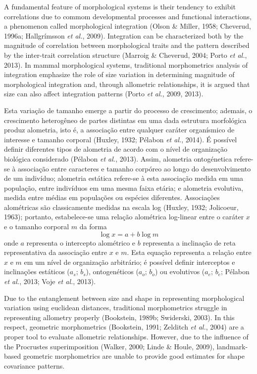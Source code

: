 \documentclass[11pt,twoside]{report}
\begin{document}
A fundamental feature of morphological systems is their tendency to
exhibit correlations due to commom developmental processes and
functional interactions, a phenomenon called morphological integration
(Olson \& Miller, 1958; Cheverud, 1996a; Hallgrímsson \emph{et al.},
2009). Integration can be characterized both by the magnitude of
correlation between morphological traits and the pattern described by
the inter-trait correlation structure (Marroig \& Cheverud, 2004; Porto
\emph{et al.}, 2013). In mammal morphological systems, traditional
morphometrics analysis of integration emphasize the role of size
variation in determining magnitude of morphological integration and,
through allometric relationships, it is argued that size can also affect
integration patterns (Porto \emph{et al.}, 2009, 2013).

Esta variação de tamanho emerge a partir do processo de crescimento;
ademais, o crescimento heterogêneo de partes distintas em uma dada
estrutura morfológica produz alometria, isto é, a associação entre
qualquer caráter organísmico de interesse e tamanho corporal (Huxley,
1932; Pélabon \emph{et al.}, 2014). É possível definir diferentes tipos
de alometria de acordo com o nível de organização biológica considerado
(Pélabon \emph{et al.}, 2013). Assim, alometria ontogénetica refere-se à
associação entre caracteres e tamanho corpóreo ao longo do
desenvolvimento de um indivíduo; alometria estática refere-se à esta
associação medida em uma população, entre indivíduos em uma mesma faixa
etária; e alometria evolutiva, medida entre médias em populações ou
espécies diferentes. Associações alométricas são classicamente medidas
na escala log (Huxley, 1932; Jolicoeur, 1963); portanto, estabelece-se
uma relação alométrica log-linear entre o caráter $x$ e o tamanho
corporal $m$ da forma \[
\log x = a + b \log m
\] onde $a$ representa o intercepto alométrico e $b$ representa a
inclinação de reta representativa da associação entre $x$ e $m$. Esta
equação representa a relação entre $x$ e $m$ em um nível de organização
arbitrário; é possível definir interceptos e inclinações estáticos
($a_s$; $b_s$), ontogenéticos ($a_o$; $b_o$) ou evolutivos ($a_e$;
$b_e$; Pélabon \emph{et al.}, 2013; Voje \emph{et al.}, 2013).

Due to the entanglement between size and shape in representing
morphological variation using euclidean distances, traditional
morphometrics struggle in representing allometry properly (Bookstein,
1989b; Swiderski, 2003). In this respect, geometric morphometrics
(Bookstein, 1991; Zelditch \emph{et al.}, 2004) are a proper tool to
evaluate allometric relationships. However, due to the influence of the
Procrustes superimposition (Walker, 2000; Linde \& Houle, 2009),
landmark-based geometric morphometrics are unable to provide good
estimates for shape covariance patterns.
\end{document}
